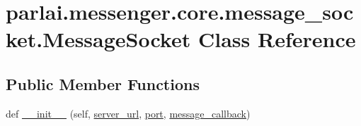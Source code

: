 \hypertarget{classparlai_1_1messenger_1_1core_1_1message__socket_1_1MessageSocket}{}\section{parlai.\+messenger.\+core.\+message\+\_\+socket.\+Message\+Socket Class Reference}
\label{classparlai_1_1messenger_1_1core_1_1message__socket_1_1MessageSocket}
\subsection*{Public Member Functions}
\begin{DoxyCompactItemize}
\item 
def \hyperlink{classparlai_1_1messenger_1_1core_1_1message__socket_1_1MessageSocket_ac0c78e003a2acf5c231bbc4aa42dfe98}{\+\_\+\+\_\+init\+\_\+\+\_\+} (self, \hyperlink{classparlai_1_1messenger_1_1core_1_1message__socket_1_1MessageSocket_abf696f625e3373836dab38b71d0a74a8}{server\+\_\+url}, \hyperlink{classparlai_1_1messenger_1_1core_1_1message__socket_1_1MessageSocket_ab84d7131041afc06174f38b5ffe86f91}{port}, \hyperlink{classparlai_1_1messenger_1_1core_1_1message__socket_1_1MessageSocket_a890f6fc26ac81d4139629a7a71928ecb}{message\+\_\+callback})
\end{DoxyCompactItemize}
